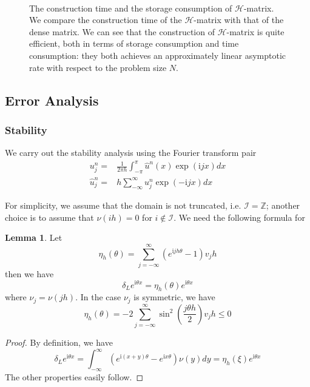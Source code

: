 \documentclass[3p,,preprint,12pt]{elsarticle}
\newcommand{\ii}[0]{\mathrm{i}}
\theoremstyle{definition}
\newtheorem{lemma}{Lemma}
\begin{document}
\begin{figure}[htpb]
\centering
\scalebox{0.4}{}~
\scalebox{0.4}{}
\caption{The construction time and the storage consumption of $\mathcal{H}$-matrix. We compare the construction time of the $\mathcal{H}$-matrix with that of the dense matrix. We can see that the construction of $\mathcal{H}$-matrix is quite efficient, both in terms of storage consumption and time consumption: they both achieves an approximately linear asymptotic rate with respect to the problem size $N$.}
\label{fig:construction}
\end{figure}



\subsection{Error Analysis}

\subsubsection{Stability}
We carry out the stability analysis using the Fourier transform pair~\cite{isaacson2012analysis}
\begin{align}
	u_j^n =& \frac{1}{2\pi h}\int_{-\pi}^\pi \hat u^n(x) \exp(\ii j x)dx\\
	\hat u_j^n =&  h \sum_{-\infty}^\infty u_j^n \exp(-\ii jx)dx
\end{align}

For simplicity, we assume that the domain is not truncated, i.e. $\mathcal{I}=\mathbb{Z}$; another choice is to assume that $\nu(ih)=0$ for $i\not\in \mathcal{I}$. We need the following formula for 
\begin{lemma}
	Let 
	\begin{equation}
		\eta_h(\theta) = \sum_{j=-\infty}^\infty (e^{\ii jh\theta}-1)v_jh
	\end{equation}
	then we have
	\begin{equation}
		\delta_L e^{\ii \theta x} = \eta_h(\theta) e^{\ii \theta x}
	\end{equation}
	where $\nu_j = \nu(jh)$. In the case $\nu_j$ is symmetric, we have
	\begin{equation}
		\eta_h(\theta) = -2\sum_{j=-\infty}^\infty \sin^2\left(\frac{j\theta h}{2} \right) v_jh\leq 0
	\end{equation}
\end{lemma}
\begin{proof}
	By definition, we have
	\[{\delta _L}{e^{\ii\theta x}} = \int_{ - \infty }^\infty  {\left( {{e^{\ii(x + y)\theta }} - {e^{\ii x\theta }}} \right)\nu (y)dy = {\eta _h}(\xi )} {e^{\ii\theta x}}\]
	The other properties easily follow. 
\end{proof}
\end{document}
